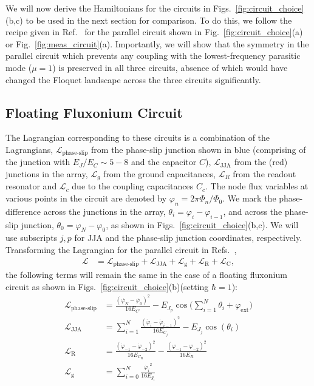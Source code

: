 \documentclass[%
reprint,
superscriptaddress,
 amsmath,amssymb,
 aps,
 prx,
longbibliography,
floatfix,
]{revtex4-2}
\begin{document}
We will now derive the Hamiltonians for the circuits in Figs.~\ref{fig:circuit_choice}(b,c) to be used in the next section for comparison. To do this, we follow the recipe given in Ref.~\cite{viola2015collective} for the parallel circuit shown in Fig.~\ref{fig:circuit_choice}(a) or Fig.~\ref{fig:meas_circuit}(a). Importantly, we will show that the symmetry in the parallel circuit which prevents any coupling with the lowest-frequency parasitic mode ($\mu=1$) is preserved in all three circuits, absence of which would have changed the Floquet landscape across the three circuits significantly. 


\subsection{Floating Fluxonium Circuit}
The Lagrangian corresponding to these circuits is a combination of the Lagrangians, $\mathcal{L}_\textrm{phase-slip}$ from the phase-slip junction shown in blue (comprising of the junction with $E_J/E_C\sim 5-8$ and the capacitor $C$), $\mathcal{L}_\textrm{JJA}$ from the (red) junctions in the array, $\mathcal{L}_{g}$ from the ground capacitances, $\mathcal{L}_{R}$ from the readout resonator and $\mathcal{L}_c$ due to the coupling capacitances $C_c$. The node flux variables at various points in the circuit are denoted by $\varphi_n=2\pi\Phi_n/\Phi_0$. We mark the phase-difference across the junctions in the array, $\theta_{i}=\varphi_i-\varphi_{i-1}$, and across the phase-slip junction, $\theta_0=\varphi_N-\varphi_{0}$, as shown in Figs.~\ref{fig:circuit_choice}(b,c). We will use subscripts $j, p$ for JJA and the phase-slip junction coordinates, respectively. Transforming the Lagrangian for the parallel circuit in Refs.~\cite{viola2015collective,ferguson2013symmetries}, 
\begin{align}
    \mathcal{L}&=\mathcal{L}_{\textrm{phase-slip}}+\mathcal{L}_{\textrm{JJA}}+\mathcal{L}_{\textrm{g}}+\mathcal{L}_{\textrm{R}}+\mathcal{L}_{\textrm{C}},
\end{align}
the following terms will remain the same in the case of a floating fluxonium circuit as shown in Figs.~\ref{fig:circuit_choice}(b)(setting $\hbar=1$):
\begin{align}
    \mathcal{L}_{\textrm{phase-slip}}&=\frac{(\dot{\varphi_N}-\dot{\varphi_0})^2}{16E_{C'}}-E_{J_p}\cos\big(\sum_{i=1}^N\theta_i+\varphi_\mathrm{ext}\big)\\
    \mathcal{L}_{\textrm{JJA}}&=\sum_{i=1}^N\frac{(\dot{\varphi}_i-\dot{\varphi}_{i-1})^2}{16E_{C_j}}-E_{J_j}\cos(\theta_i)\\
    \mathcal{L}_{\textrm{R}}&=\frac{(\dot{\varphi}_{-1}-\dot{\varphi}_{-2})^2}{16E_{C_\textrm{R}}}-\frac{(\varphi_{-1}-\varphi_{-2})^2}{16E_{R}}\\
    \mathcal{L}_{\textrm{g}}&=\sum_{i=0}^{N} \frac{\dot{\varphi_i}^2}{16E_{g_i}}\label{eq:float-float}
  \end{align}
\end{document}
